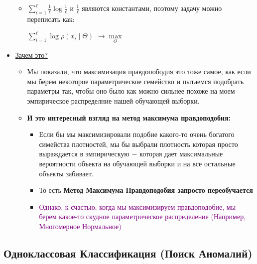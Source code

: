\begin{itemize}
\begin{itemize}
                \item $\sum\limits_{i = 1}^\ell \frac{1}{\ell} \log \frac{1}{\ell}$ и $\frac{1}{\ell}$ являются константами, поэтому задачу можно переписать как:
                \begin{center}
                    \Large
                    \colorbox{green!20}{
                    $\sum\limits_{i = 1}^\ell \log \rho(x_i \mid \Theta )$ $\longrightarrow \max\limits_\Theta$}
                \end{center}
            \end{itemize}

            \item \underline{Зачем это?}
            \begin{itemize}
                \item Мы показали, что максимизация правдопободия это тоже самое, как если мы берем некоторое параметрическое семейство и пытаемся подобрать параметры так, чтобы оно было как можно сильнее похоже на моем эмпирическое распределние нашей обучающей выборки.

                \item \textbf{И это интересный взгляд на метод максимума правдоподобия:}
                \begin{itemize}
                    \item Если бы мы максимизировали подобие какого-то очень богатого симейства плотностей, мы бы выбрали плотность которая просто выраждается в эмпирическую $-$ которая дает максимальные вероятности объекта на обучающей выборки и на все остальные объекты забивает.

                    \item То есть \textbf{Метод Максимума Правдоподобия запросто переобучается}

                    \item \textcolor{purple}{Однако, к счастью, когда мы максимизируем правдоподобие, мы берем какое-то скудное параметрическое распределение (Например, Многомерное Нормальное)}
                \end{itemize}
            \end{itemize}
        \end{itemize}
        

    \subsection{Одноклассовая Классификация (Поиск Аномалий)}

